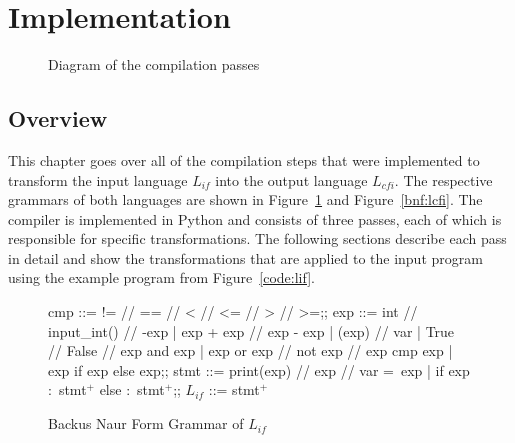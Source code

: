 \section{Implementation}

\begin{figure}[h!]
	\centering
	\caption{Diagram of the compilation passes}
\end{figure}

\subsection{Overview}
This chapter goes over all of the compilation steps that were implemented to transform the input language $L_{if}$ into the output language $L_{cfi}$. 
The respective grammars of both languages are shown in Figure~\ref{bnf:lif} and Figure~\ref{bnf:lcfi}.
The compiler is implemented in Python and consists of three passes, each of which is responsible for specific transformations.
The following sections describe each pass in detail and show the transformations that are applied to the input program using the example program from Figure~\ref{code:lif}.

\begin{figure}[h!]
	\centering
	\begin{bnf}[row{-} = {bg = gray9}]
		cmp ::= != // == // < // <= // > // >=;;
		exp ::= int // input\_int() // -exp
		| exp + exp // exp - exp
		| (exp) // var
		| True // False // exp and exp
		| exp or exp // not exp // exp cmp exp
		| exp if exp else exp;;
		stmt ::= print(exp) // exp // var = exp
		| if exp $\colon$ stmt$^+$ else $\colon$ stmt$^+$;;
		$L_{if}$ ::= stmt$^+$
	\end{bnf}
	\caption{Backus Naur Form Grammar of $L_{if}$}
	\label{bnf:lif}
\end{figure}

